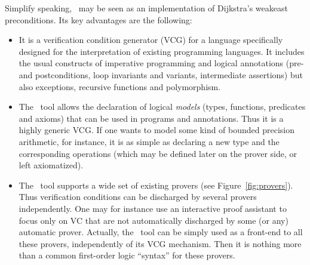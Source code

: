 \documentclass[a4paper,12pt]{report}
\begin{document}
Simplify speaking, \why\ may be seen as an implementation
of Dijkstra's weakeast preconditions. Its key advantages are the
following: 
\begin{itemize}
\item 
  It is a verification condition generator (VCG) for a language
  specifically designed for the interpretation of existing programming
  languages. It includes the usual constructs of imperative
  programming and logical annotations (pre- and postconditions, loop
  invariants and variants, intermediate assertions) but also
  exceptions, recursive functions and polymorphism.

\item 
  The \why\ tool allows the declaration of logical \emph{models}
  (types, functions, predicates and axioms) that can be used in
  programs and annotations. Thus it is a highly generic VCG.  If one
  wants to model some kind of bounded precision arithmetic, for
  instance, it is as simple as declaring a new type and the
  corresponding operations (which may be defined later on the prover
  side, or left axiomatized).

\item
  The \why\ tool supports a wide set of existing provers
  (see Figure~\ref{fig:provers}). Thus verification conditions can be
  discharged by several provers independently. One may for instance
  use an interactive proof assistant to focus only on VC that are not
  automatically discharged by some (or any) automatic prover.
  Actually, the \why\ tool can be simply used as a front-end to all
  these provers, independently of its VCG mechanism. Then it is
  nothing more than a common first-order logic ``syntax'' for these
  provers. 

\end{itemize}
\end{document}
